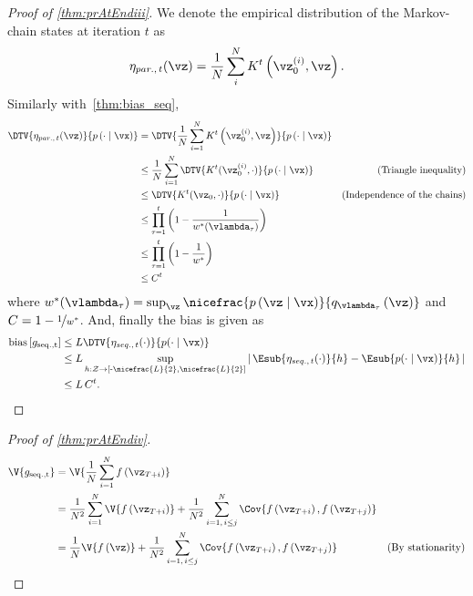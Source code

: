 \prAtEndRestateiii*
\label{proofsection:prAtEndiii}\begin{proof}[Proof of \autoref{thm:prAtEndiii}]\label{proof:prAtEndiii}We denote the empirical distribution of the Markov-chain states at iteration \(t\) as \begin {align} \eta _{par.,\, t}(\vz ) = \frac {1}{N} \sum _{i}^N K^{t}\left (\vz _0^{(i)}, \vz \right ). \end {align} Similarly with~\cref {thm:bias_seq}, \begin {align} \DTV { \eta _{par.,\, t}(\vz ) }{p\left (\cdot \mid \vx \right )} &= \DTV {\frac {1}{N} \sum _{i=1}^N K^{t}\left (\vz _0^{(i)}, \vz \right )}{p\left (\cdot \mid \vx \right )} \\ &\leq \frac {1}{N} \sum _{i=1}^N \DTV {K^t(\vz _0^{(i)}, \cdot )}{p\left (\cdot \mid \vx \right )} &\text {(Triangle inequality)} \\ &\leq \DTV {K^t(\vz _0, \cdot )}{p\left (\cdot \mid \vx \right )} &\text {(Independence of the chains)} \\ &\leq \prod _{\tau =1}^t {\left (1 - \frac {1}{w^*(\vlambda _{\tau })}\right )} \\ &\leq \prod _{\tau =1}^t {\left (1 - \frac {1}{w^*}\right )} \\ &\leq C^t \end {align} where \(w^*(\vlambda _{\tau }) = \sup _{\vz } \nicefrac {p\left (\vz \mid \vx \right )}{q_{\vlambda _{\tau }}\left (\vz \right )} \) and \(C = 1 - \nicefrac {1}{w^*}\). And, finally the bias is given as \begin {align} \mathrm {bias}\left [ g_{\mathrm {seq., t}} \right ] &\leq L \DTV {\eta _{seq.,\, t}(\cdot )}{p(\cdot \mid \vx )} \\ &\leq L \sup _{h : \mathcal {Z} \rightarrow \left [ \text {-}\nicefrac {L}{2}, \nicefrac {L}{2} \right ]} \left |\, \Esub {\eta _{seq.,\, t}(\cdot )}{h} - \Esub {p(\cdot \mid \vx )}{h} \,\right | \\ &\leq L \, C^t. \end {align}\end{proof}
\prAtEndRestateiv*
\label{proofsection:prAtEndiv}\begin{proof}[Proof of \autoref{thm:prAtEndiv}]\label{proof:prAtEndiv}\begin {align} \V {g_{\mathrm {seq., t}}} &= \V { \frac {1}{N} \sum _{i=1}^{N} f\left (\vz _{T + i}\right ) } \\ &= \frac {1}{N^2} \sum _{i=1}^{N} \V { f\left (\vz _{T+i}\right ) } + \frac {1}{N^2} \sum _{i=1,\, i \leq j}^{N} \Cov { f\left (\vz _{T+i}\right ), f\left (\vz _{T+j}\right ) } \\ &= \frac {1}{N} \V { f\left (\vz \right ) } + \frac {1}{N^2} \sum _{i=1,\, i \leq j}^{N} \Cov { f\left (\vz _{T+i}\right ), f\left (\vz _{T+j}\right ) } &\text {(By stationarity)} \\ \end {align}\end{proof}
